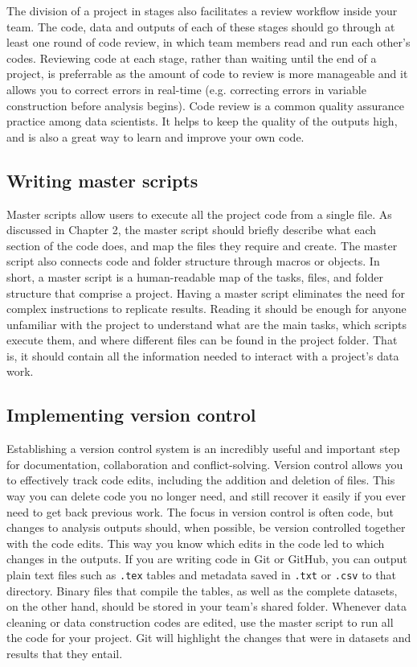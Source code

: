 The division of a project in stages also facilitates a review workflow inside your team.
The code, data and outputs of each of these stages should go through at least one round of code review,
in which team members read and run each other's codes.
Reviewing code at each stage, rather than waiting until the end of a project,
is preferrable as the amount of code to review is more manageable and
it allows you to correct errors in real-time (e.g. correcting errors in variable construction before analysis begins).
Code review is a common quality assurance practice among data scientists.
It helps to keep the quality of the outputs high, and is also a great way to learn and improve your own code.

\subsection{Writing master scripts}

Master scripts allow users to execute all the project code from a single file.
As discussed in Chapter 2, the master script should briefly describe what each
section of the code does, and map the files they require and create.
The master script also connects code and folder structure through macros or objects.
In short, a master script is a human-readable map of the tasks,
files, and folder structure that comprise a project.
Having a master script eliminates the need for complex instructions to replicate results.
Reading it should be enough for anyone unfamiliar with the project
to understand what are the main tasks, which scripts execute them,
and where different files can be found in the project folder.
That is, it should contain all the information needed to interact with a project's data work.

\subsection{Implementing version control}

Establishing a version control system is an incredibly useful
and important step for documentation, collaboration and conflict-solving.
Version control allows you to effectively track code edits,
including the addition and deletion of files.
This way you can delete code you no longer need,
and still recover it easily if you ever need to get back previous work.
The focus in version control is often code, but changes to analysis outputs should, when possible, be version controlled together with the code edits.
This way you know which edits in the code led to which changes in the outputs.
If you are writing code in Git or GitHub,
you can output plain text files such as \texttt{.tex} tables
and metadata saved in \texttt{.txt} or \texttt{.csv} to that directory.
Binary files that compile the tables,
as well as the complete datasets, on the other hand,
should be stored in your team's shared folder.
Whenever data cleaning or data construction codes are edited,
use the master script to run all the code for your project.
Git will highlight the changes that were in datasets and results that they entail.


